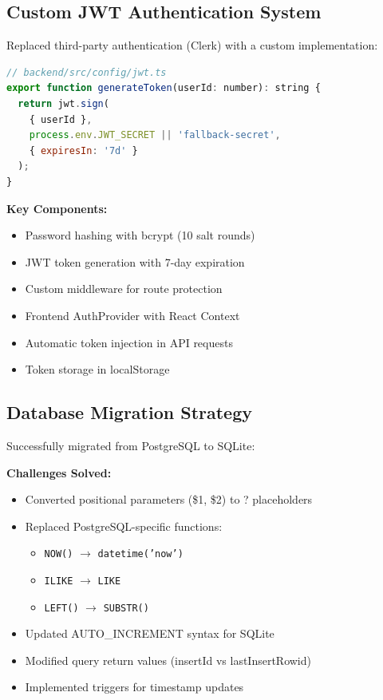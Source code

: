 \documentclass[11pt,a4paper]{article}
\begin{document}
\subsection{Custom JWT Authentication System}

Replaced third-party authentication (Clerk) with a custom implementation:

\begin{lstlisting}[language=JavaScript, caption=JWT Token Generation]
// backend/src/config/jwt.ts
export function generateToken(userId: number): string {
  return jwt.sign(
    { userId },
    process.env.JWT_SECRET || 'fallback-secret',
    { expiresIn: '7d' }
  );
}
\end{lstlisting}

\textbf{Key Components:}
\begin{itemize}[leftmargin=*]
    \item Password hashing with bcrypt (10 salt rounds)
    \item JWT token generation with 7-day expiration
    \item Custom middleware for route protection
    \item Frontend AuthProvider with React Context
    \item Automatic token injection in API requests
    \item Token storage in localStorage
\end{itemize}

\subsection{Database Migration Strategy}

Successfully migrated from PostgreSQL to SQLite:

\textbf{Challenges Solved:}
\begin{itemize}[leftmargin=*]
    \item Converted positional parameters (\$1, \$2) to ? placeholders
    \item Replaced PostgreSQL-specific functions:
    \begin{itemize}
        \item \texttt{NOW()} $\rightarrow$ \texttt{datetime('now')}
        \item \texttt{ILIKE} $\rightarrow$ \texttt{LIKE}
        \item \texttt{LEFT()} $\rightarrow$ \texttt{SUBSTR()}
    \end{itemize}
    \item Updated AUTO\_INCREMENT syntax for SQLite
    \item Modified query return values (insertId vs lastInsertRowid)
    \item Implemented triggers for timestamp updates
\end{itemize}
\end{document}
